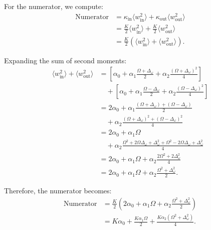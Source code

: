 \documentclass[a4paper,pre,superscriptaddress,floatfix,nofootinbib,twocolumn]{revtex4-1}
\begin{document}
For the numerator, we compute:
\begin{align*}
\text{Numerator} &= \kappa_\text{in} \langle w^2_\text{in} \rangle + \kappa_\text{out} \langle w^2_\text{out} \rangle\\
&= \frac{K}{2} \langle w^2_\text{in} \rangle + \frac{K}{2} \langle w^2_\text{out} \rangle\\
&= \frac{K}{2} \left(\langle w^2_\text{in} \rangle + \langle w^2_\text{out} \rangle\right).
\end{align*}

Expanding the sum of second moments:
\begin{align*}
\langle w^2_\text{in} \rangle + \langle w^2_\text{out} \rangle &= \left[\alpha_0 + \alpha_1 \frac{\Omega + \Delta_\omega}{2} + \alpha_2 \frac{(\Omega + \Delta_\omega)^2}{4}\right]\\
&\quad + \left[\alpha_0 + \alpha_1 \frac{\Omega - \Delta_\omega}{2} + \alpha_2 \frac{(\Omega - \Delta_\omega)^2}{4}\right]\\
&= 2\alpha_0 + \alpha_1 \frac{(\Omega + \Delta_\omega) + (\Omega - \Delta_\omega)}{2}\\
&\quad + \alpha_2 \frac{(\Omega + \Delta_\omega)^2 + (\Omega - \Delta_\omega)^2}{4}\\
&= 2\alpha_0 + \alpha_1 \Omega \\
&\quad + \alpha_2 \frac{\Omega^2 + 2\Omega\Delta_\omega + \Delta_\omega^2 + \Omega^2 - 2\Omega\Delta_\omega + \Delta_\omega^2}{4}\\
&= 2\alpha_0 + \alpha_1 \Omega + \alpha_2 \frac{2\Omega^2 + 2\Delta_\omega^2}{4}\\
&= 2\alpha_0 + \alpha_1 \Omega + \alpha_2 \frac{\Omega^2 + \Delta_\omega^2}{2}.
\end{align*}

Therefore, the numerator becomes:
\begin{align*}
\text{Numerator} &= \frac{K}{2} \left(2\alpha_0 + \alpha_1 \Omega + \alpha_2 \frac{\Omega^2 + \Delta_\omega^2}{2}\right)\\
&= K\alpha_0 + \frac{K\alpha_1 \Omega}{2} + \frac{K\alpha_2(\Omega^2 + \Delta_\omega^2)}{4}.
\end{align*}
\end{document}
